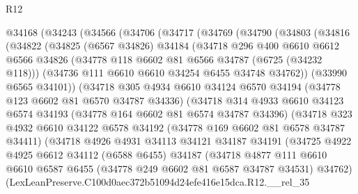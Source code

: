 \begin{lexlean}{R12}
\begin{coremodule}
  @34168
    (@34243
      (@34566
        (@34706
          (@34717
            (@34769
              (@34790
                (@34803
                  (@34816
                    (@34822
                      (@34825
                        (@6567 @34826)
                        @34184
                        (@34718
                          @296
                          @400
                          @6610
                          @6612
                          @6566
                          @34826
                          (@34778 @118 @6602 @81 @6566 @34787 (@6725 (@34232 @118)))
                          (@34736 @111 @6610 @6610 @34254 @6455 @34748 @34762))
                        (@33990 @6565 @34101))
                      (@34718
                        @305
                        @4934
                        @6610
                        @34124
                        @6570
                        @34194
                        (@34778 @123 @6602 @81 @6570 @34787 @34336)
                        (@34718
                          @314
                          @4933
                          @6610
                          @34123
                          @6574
                          @34193
                          (@34778 @164 @6602 @81 @6574 @34787 @34396)
                          (@34718
                            @323
                            @4932
                            @6610
                            @34122
                            @6578
                            @34192
                            (@34778 @169 @6602 @81 @6578 @34787 @34411)
                            (@34718
                              @4926
                              @4931
                              @34113
                              @34121
                              @34187
                              @34191
                              (@34725
                                @4922
                                @4925
                                @6612
                                @34112
                                (@6588 @6455)
                                @34187
                                (@34718
                                  @4877
                                  @111
                                  @6610
                                  @6610
                                  @6587
                                  @6455
                                  (@34778 @249 @6602 @81 @6587 @34787 @34531)
                                  @34762)
                                (LexLeanPreserve.C100d0aec372b51094d24efe416e15dca.R12.__rel_35

\end{coremodule}
\end{lexlean}
